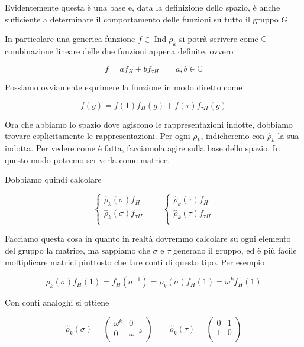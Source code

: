 \documentclass[11pt]{article}
\theoremstyle{plain}
\theoremstyle{definition}
\theoremstyle{remark}
\newcommand{\C}{\mathbb{C}}
\DeclareMathOperator{\Ind}{Ind}
\begin{document}
Evidentemente questa è una base e, data la definizione dello spazio, è anche sufficiente a determinare il comportamento delle funzioni su tutto il gruppo $G$.

In particolare una generica funzione $f \in \Ind \rho_k$ si potrà scrivere come $\C$ combinazione lineare delle due funzioni appena definite, ovvero

\[ f = a f_H + b f_{\tau H} \qquad a,b \in \C\]


Possiamo ovviamente esprimere la funzione in modo diretto come

\[ f(g) = f(1) f_H(g) + f(\tau) f_{\tau H} (g) \]

Ora che abbiamo lo spazio dove agiscono le rappresentazioni indotte, dobbiamo trovare esplicitamente le rappresentazioni. Per ogni $\rho_k$, indicheremo con $\hat \rho_k$ la sua indotta. Per vedere come è fatta, facciamola agire sulla base dello spazio. In questo modo potremo scriverla come matrice.

Dobbiamo quindi calcolare

\[ 
\begin{cases}
\hat \rho_k (\sigma) f_H \\ 
\hat \rho_k (\sigma) f_{\tau H} \\
\end{cases}
\qquad
\begin{cases}
\hat \rho_k (\tau) f_H \\
\hat \rho_k (\tau) f_{\tau H}\\
\end{cases}
\]

Facciamo questa cosa in quanto in realtà dovremmo calcolare su ogni elemento del gruppo la matrice, ma sappiamo che $\sigma$ e $\tau$ generano il gruppo, ed è più facile moltiplicare matrici piuttosto che fare conti di questo tipo.  Per esempio


\[ 
\hat \rho_k (\sigma) f_H(1) = f_H(\sigma^{-1}) = \rho_k(\sigma) f_H(1) = \omega^k f_H(1)
\]

Con conti analoghi si ottiene


\[ 
\hat \rho_k (\sigma) = 
\left(
\begin{array}{cc}
\omega^k & 0 \\
0 & \omega^{-k} \\
\end{array}
\right)
\qquad
\hat \rho_k (\tau) = 
\left(
\begin{array}{cc}
0 & 1 \\
1 & 0 \\
\end{array}
\right)
\]
\end{document}
